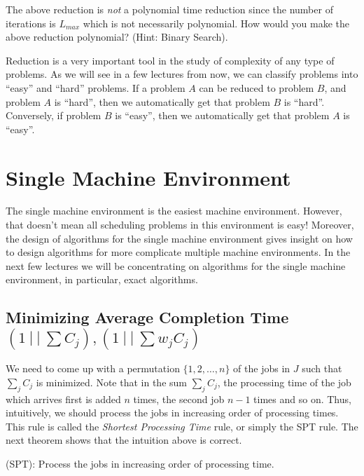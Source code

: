 \documentclass[11pt]{article}
\begin{document}
\begin{exercise}
The above reduction is {\em not} a polynomial time reduction since the number of iterations is $L_{max}$ which is not necessarily polynomial.
How would you make the above reduction polynomial? (Hint: Binary Search).
\end{exercise}

Reduction is a very important tool in the study of complexity of any type of problems. As we will see in a few lectures from now, we can 
classify problems into ``easy'' and ``hard'' problems. If a problem $A$ can be reduced to problem $B$, and problem $A$ is ``hard'', then we 
automatically get that problem $B$ is ``hard''. Conversely, if problem $B$ is ``easy'', then we automatically get that problem $A$ is ``easy''.

\section{Single Machine Environment}
The single machine environment is the easiest machine environment. However, that doesn't mean all scheduling problems in this environment
is easy! Moreover, the design of algorithms for the single machine environment gives insight on how to design algorithms for more complicate
multiple machine environments. In the next few lectures we will be concentrating on algorithms for the single machine environment, in particular,
exact algorithms.

\subsection{Minimizing Average Completion Time $(1~|~|~\sum C_j), (1~|~|~\sum w_jC_j)$}
We need to come up with a permutation $\{1,2,\ldots,n\}$ of the jobs in $J$ such that $\sum_j C_j$ is minimized. Note that in the sum
$\sum_j C_j$, the processing time of the job which arrives first is added $n$ times, the second job $n-1$ times and so on. Thus, intuitively,
we should process the jobs in increasing order of processing times. This rule is called the {\em Shortest Processing Time}
rule, or simply the SPT rule. The next theorem shows that the intuition above is correct.

\begin{definition}
(SPT): Process the jobs in increasing order of processing time.
\end{definition}
\end{document}
